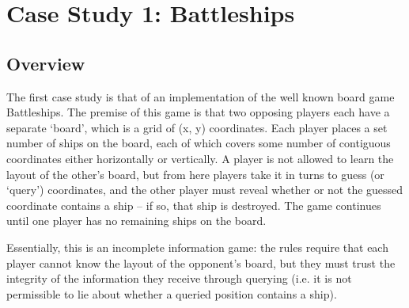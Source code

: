 \section{Case Study 1: Battleships} \label{sect_cs_battleships}

%
%
%
%
%
%
%
%
%
%
%
%
%
%

\subsection{Overview}

The first case study is that of an implementation of the well known board game Battleships. The premise of this game is that two opposing players each have a separate `board', which is a grid of (x, y) coordinates. Each player places a set number of ships on the board, each of which covers some number of contiguous coordinates either horizontally or vertically. A player is not allowed to learn the layout of the other's board, but from here players take it in turns to guess (or `query') coordinates, and the other player must reveal whether or not the guessed coordinate contains a ship -- if so, that ship is destroyed. The game continues until one player has no remaining ships on the board.

Essentially, this is an incomplete information game: the rules require that each player cannot know the layout of the opponent's board, but they must trust the integrity of the information they receive through querying (i.e. it is not permissible to lie about whether a queried position contains a ship).

